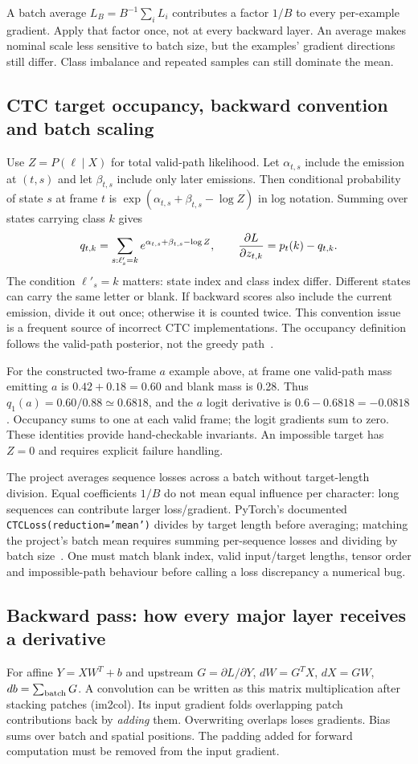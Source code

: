 A batch average $L_B=B^{-1}\sum_iL_i$ contributes a factor $1/B$ to every
per-example gradient. Apply that factor once, not at every backward layer.
An average makes nominal scale less sensitive to batch size, but the examples'
gradient directions still differ. Class imbalance and repeated samples can
still dominate the mean.

\subsection{CTC target occupancy, backward convention and batch scaling}
Use $Z=P(\ell\mid X)$ for total valid-path likelihood. Let
$\alpha_{t,s}$ include the emission at $(t,s)$ and let $\beta_{t,s}$
include only later emissions. Then conditional probability of state $s$ at
frame $t$ is $\exp(\alpha_{t,s}+\beta_{t,s}-\log Z)$ in log notation.
Summing over states carrying class $k$ gives
\[
q_{t,k}=\sum_{s:\ell'_s=k}
e^{\alpha_{t,s}+\beta_{t,s}-\log Z},\qquad
{\partial L\over\partial z_{t,k}}=p_t(k)-q_{t,k}.
\]
The condition $\ell'_s=k$ matters: state index and class index differ.
Different states can carry the same letter or blank. If backward scores
also include the current emission, divide it out once; otherwise it is
counted twice. This convention issue is a frequent source of incorrect
CTC implementations. The occupancy definition follows the valid-path
posterior, not the greedy path~\cite{gravesbook}.

For the constructed two-frame $a$ example above, at frame one valid-path
mass emitting $a$ is $0.42+0.18=0.60$ and blank mass is 0.28.
Thus $q_1(a)=0.60/0.88\simeq0.6818$, and the $a$ logit derivative is
$0.6-0.6818=-0.0818$. Occupancy sums to one at each valid frame; the logit
gradients sum to zero. These identities provide hand-checkable invariants.
An impossible target has $Z=0$ and requires explicit failure handling.

The project averages sequence losses across a batch without target-length
division. Equal coefficients $1/B$ do not mean equal influence per character:
long sequences can contribute larger loss/gradient. PyTorch's documented
\texttt{CTCLoss(reduction='mean')} divides by target length before averaging;
matching the project's batch mean requires summing per-sequence losses and
dividing by batch size~\cite{torchctc}. One must match blank index, valid
input/target lengths, tensor order and impossible-path behaviour before
calling a loss discrepancy a numerical bug.

\subsection{Backward pass: how every major layer receives a derivative}
For affine $Y=XW^T+b$ and upstream $G=\partial L/\partial Y$,
$dW=G^TX$, $dX=GW$, $db=\sum_{\rm batch}G$. A convolution can be
written as this matrix multiplication after stacking patches (im2col).
Its input gradient folds overlapping patch contributions back by \emph{adding}
them. Overwriting overlaps loses gradients. Bias sums over batch and spatial
positions. The padding added for forward computation must be removed from
the input gradient.

